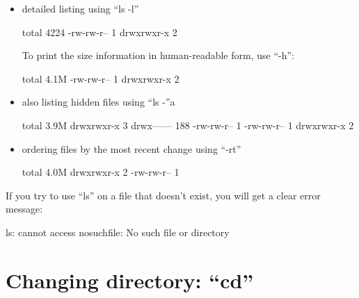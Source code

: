 \begin{itemize}
\item detailed listing using ``ls -l''

\begin{prompt}
total 4224
-rw-rw-r-- 1 %
drwxrwxr-x 2 %
\end{prompt}

To print the size information in human-readable form, use ``-h'':

\begin{prompt}
total 4.1M
-rw-rw-r-- 1 %
drwxrwxr-x 2 %
\end{prompt}

\item also listing hidden files using ``ls -''a
\begin{prompt}
total 3.9M
drwxrwxr-x   3 %
drwx------ 188 %
-rw-rw-r--   1 %
-rw-rw-r--   1 %
drwxrwxr-x   2 %
\end{prompt}

\item ordering files by the most recent change using ``-rt''

\begin{prompt}
total 4.0M
drwxrwxr-x 2 %
-rw-rw-r-- 1 %
\end{prompt}

\end{itemize}

If you try to use ``ls'' on a file that doesn't exist, you will get a clear error message:

\begin{prompt}
ls: cannot access nosuchfile: No such file or directory
\end{prompt}

\section{Changing directory: ``cd''}

